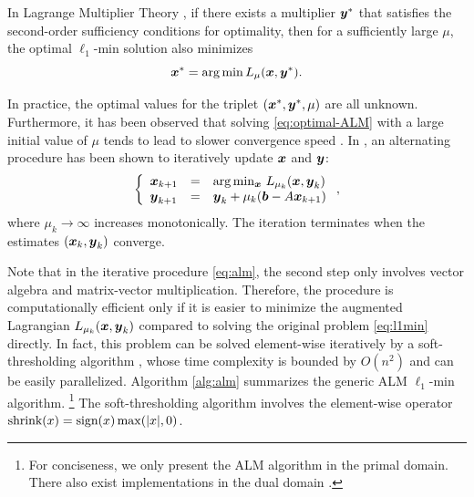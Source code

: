 \documentclass[preprint]{sigplanconf}
\begin{document}
In Lagrange Multiplier Theory \cite{BertsekasD2003}, if there exists a multiplier $\boldsymbol{y}^*$ that
satisfies the second-order sufficiency conditions for optimality, then for a sufficiently large $\mu$, the optimal
$\ell_1$-min solution also minimizes
\begin{equation}
{\boldsymbol{x}}^* = \arg \min L_\mu({\boldsymbol{x}},{\boldsymbol{y}}^*).
\label{eq:optimal-ALM}
\end{equation}

In practice, the optimal values for the triplet $({\boldsymbol{x}}^*, {\boldsymbol{y}}^*, \mu)$ are all
unknown. Furthermore, it has been observed that solving
\eqref{eq:optimal-ALM} with a large initial value of $\mu$ tends to lead to
slower convergence speed \cite{WrightS2008,YangA2010-ICIP}. In
\cite{BertsekasD2003,YangJ2009}, an alternating procedure has been shown to
iteratively update ${\boldsymbol{x}}$ and ${\boldsymbol{y}}$:
\begin{equation}
\left \{
\begin{array}{lll}
{\boldsymbol{x}}_{k+1} & = & \arg\min_{{\boldsymbol{x}}} \, L_{\mu_k} ({\boldsymbol{x}},{\boldsymbol{y}}_k)\\
{\boldsymbol{y}}_{k+1} & = & {\boldsymbol{y}}_k + \mu_k ({\boldsymbol{b}} - A{\boldsymbol{x}}_{k+1}) \\
\end{array}
\right . ,
\label{eq:alm}
\end{equation}
where $\mu_{k}\rightarrow \infty$ increases monotonically.
The iteration terminates when the estimates $({\boldsymbol{x}}_k, {\boldsymbol{y}}_k)$ converge.

Note that in the iterative procedure \eqref{eq:alm}, the second
step only involves vector algebra and matrix-vector multiplication. Therefore,
the procedure is computationally efficient only if it is easier to minimize the
augmented Lagrangian $L_{\mu_k} ({\boldsymbol{x}},{\boldsymbol{y}}_k)$ compared to solving the original problem
\eqref{eq:l1min} directly. In fact, this problem can be solved element-wise
iteratively by a soft-thresholding algorithm \cite{WrightS2008,BeckA2009},
whose time complexity is bounded by $O(n^2)$ and can be easily parallelized.
Algorithm \ref{alg:alm} summarizes the generic ALM $\ell_1$-min algorithm. \footnote{For conciseness, we
only present the ALM algorithm in the primal domain. There also
exist implementations in the dual domain \cite{YangJ2009,YangA2010-ICIP}.}
The soft-thresholding algorithm involves the element-wise operator ${\text{shrink}}(x) = {\text{sign}}(x)\max(|x|,0)$.
\end{document}
